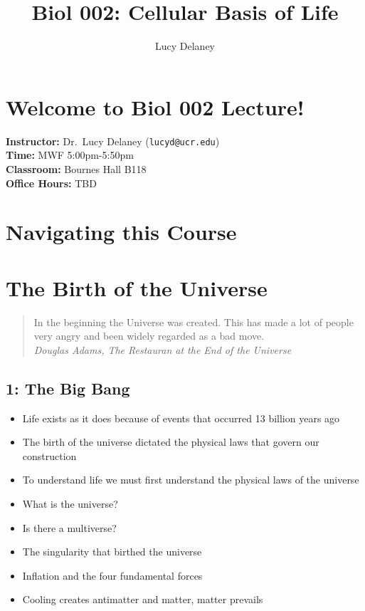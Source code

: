 \documentclass[
]{report}
\title{Biol 002: Cellular Basis of Life}
\author{Lucy Delaney}
\date{}
\providecommand{\tightlist}{%
  \setlength{\itemsep}{0pt}\setlength{\parskip}{0pt}}
\providecommand{\tightlist}{%
  \setlength{\itemsep}{0pt}\setlength{\parskip}{0pt}}
\begin{document}
\maketitle

{
\setcounter{tocdepth}{1}
\tableofcontents
}
\hypertarget{welcome-to-biol-002-lecture}{%
\chapter*{Welcome to Biol 002 Lecture!}\label{welcome-to-biol-002-lecture}}

\textbf{Instructor:} Dr.~Lucy Delaney (\texttt{lucyd@ucr.edu})\\
\textbf{Time:} MWF 5:00pm-5:50pm\\
\textbf{Classroom:} Bournes Hall B118\\
\textbf{Office Hours:} TBD

\hypertarget{navigating-this-course}{%
\chapter*{Navigating this Course}\label{navigating-this-course}}

\hypertarget{the-birth-of-the-universe}{%
\chapter{The Birth of the Universe}\label{the-birth-of-the-universe}}

\begin{quote}
In the beginning the Universe was created. This has made a lot of people very angry and been widely regarded as a bad move.\\
\emph{Douglas Adams, The Restauran at the End of the Universe}
\end{quote}

\hypertarget{the-big-bang}{%
\section*{1: The Big Bang}\label{the-big-bang}}

\begin{itemize}
\tightlist
\item
  Life exists as it does because of events that occurred 13 billion years ago
\item
  The birth of the universe dictated the physical laws that govern our construction
\item
  To understand life we must first understand the physical laws of the universe
\item
  What is the universe?
\item
  Is there a multiverse?
\item
  The singularity that birthed the universe
\item
  Inflation and the four fundamental forces
\item
  Cooling creates antimatter and matter, matter prevails
\end{itemize}
\end{document}
